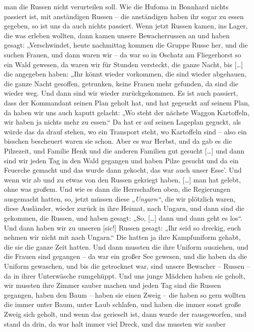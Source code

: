 \documentclass[ngerman,]{article}
\begin{document}
\begin{multicols}{2}
\begin{description}
man die Russen nicht verurteilen soll. Wie die Hufoma in Bonnhard nichts
passiert ist, mit anständigen Russen – die anständigen haben ihr sogar
zu essen gegeben, so ist uns da auch nichts passiert. Wenn jetzt Russen
kamen, ins Lager, die was erleben wollten, dann kamen unsere
Bewacherrussen an und haben gesagt: „Verschwindet, heute nachmittag
kommen die Gruppe Russe her, und die suchen Frauen, und dann waren wir –
da war so in Oschatz am Fliegerhorst so ein Wald gewesen, da waren wir
für Stunden versteckt, die ganze Nacht, bis {[}\ldots{}{]} die angegeben
haben: „Ihr könnt wieder vorkommen, die sind wieder abgehauen, die ganze
Nacht gesoffen, getrunken, keine Frauen mehr gefunden, da sind die
wieder weg. Und dann sind wir wieder zurückgekommen. Es ist auch
passiert, dass der Kommandant seinen Plan geholt hat, und hat gegeuckt
auf seinem Plan, da haben wir uns auch kaputt gelacht: „Wo steht der
nächste Waggon Kartoffeln, wir haben ja nichts mehr zu essen.“ Da hat er
auf seinen Lageplan geguckt, als würde das da drauf stehen, wo ein
Transport steht, wo Kartoffeln sind – also ein bisschen bescheuert waren
sie schon. Aber es war Herbst, und da gab es die Pilzezeit, und Familie
Henk und die anderen Familien gut gesucht {[}\ldots{}{]} und dann sind
wir jeden Tag in den Wald gegangen und haben Pilze gesucht und da ein
Feuerche gemacht und das wurde dann gekocht, das war auch unser Esse'.
Und wenn wir ab und zu etwas von den Russen gekriegt haben,
{[}\ldots{}{]} man hat gelebt, ohne was großem. Und wie es dann die
Herrschaften oben, die Regierungen ausgemacht hatten, so, jetzt müssen
diese \emph{„Ungarn“}, die wir plötzlich waren, diese Ausländer, wieder
zurück in ihre Heimat, nach Ungarn, und dann sind die gekommen, die
Russen, und haben gesagt: „So, {[}\ldots{}{]} dann und dann geht es
los“. Und dann haben wir zu unseren {[}sic!{]} Russen gesagt: „Ihr seid
so dreckig, euch nehmen wir nicht mit nach Ungarn.“ Die hatten ja ihre
Kampfuniform gehabt, die sie die ganze Zeit hatten. Und dann mussten die
ihre Uniform ausziehen, und die Frauen sind gegangen – da war ein großer
See gewesen, und die haben da die Uniform gewaschen, und bis die
getrocknet war, sind unsere Bewacher – Russen – da in ihrer Unterwäsche
rumgehüppt. Und uns junge Mädchen haben sie geholt, wir mussten ihre
Zimmer sauber machen und jeden Tag sind die Russen gegangen, haben den
Baum – haben sie einen Zweig – die haben so gern wollten die immer unter
Baum, unter Laub schlafen, und haben die immer sonst große Zweig sich
geholt, und wenn das gerieselt ist, dann wurde der rausgeworfen, und
stand da drin, da war halt immer viel Dreck, und das mussten wir sauber

\end{description}
\end{multicols}
\end{document}
